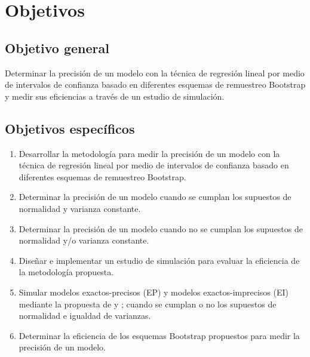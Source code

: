 \section{Objetivos}
\subsection{Objetivo general}
Determinar la precisión de un modelo con la técnica de regresión lineal por medio de intervalos de confianza basado en diferentes esquemas de remuestreo Bootstrap y medir sus eficiencias a través de un estudio de simulación.
\vspace{.5cm}
\subsection{Objetivos específicos}
\begin{enumerate}
\item Desarrollar la metodología para medir la precisión de un modelo con la técnica de regresión lineal por medio de intervalos de confianza basado en diferentes esquemas de remuestreo Bootstrap.
\item Determinar la precisión de un modelo cuando se cumplan los supuestos de normalidad y varianza constante.
\item Determinar la precisión de un modelo cuando no se cumplan los supuestos de normalidad y/o varianza constante.
\item Diseñar e implementar un estudio de simulación para evaluar la eficiencia de la metodología propuesta.
\item Simular modelos exactos-precisos (EP) y modelos exactos-imprecisos (EI) mediante la propuesta de \textcite{febles-2014} y \textcite{zacarias-2023}; cuando se cumplan o no los supuestos de normalidad e igualdad de varianzas.
\item Determinar la eficiencia de los esquemas Bootstrap propuestos para medir la precisión de un modelo.
\end{enumerate}
